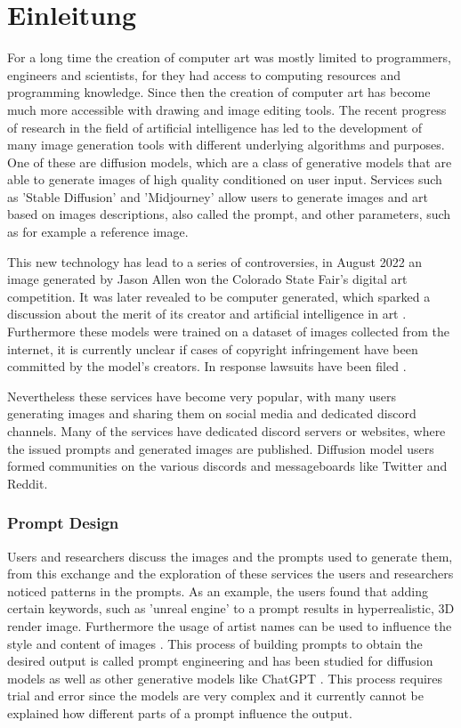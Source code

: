 \chapter{Einleitung}
\label{cha:Introduction}

For a long time the creation of computer art was mostly limited to programmers, engineers and scientists, for they had access to computing resources and programming knowledge. Since then the creation of computer art has become much more accessible with drawing and image editing tools. The recent progress of research in the field of artificial intelligence has led to the development of many image generation tools with different underlying algorithms and purposes. One of these are diffusion models, which are a class of generative models that are able to generate images of high quality conditioned on user input. Services such as 'Stable Diffusion' and 'Midjourney' allow users to generate images and art based on images descriptions, also called the prompt, and other parameters, such as for example a reference image.

This new technology has lead to a series of controversies, in August 2022 an image generated by Jason Allen won the Colorado State Fair's digital art competition. It was later revealed to be computer generated, which sparked a discussion about the merit of its creator and artificial intelligence in art \autocite{colorado}. Furthermore these models were trained on a dataset of images collected from the internet, it is currently unclear if cases of copyright infringement have been committed by the model's creators. In response lawsuits have been filed \autocite{getty}.

Nevertheless these services have become very popular, with many users generating images and sharing them on social media and dedicated discord channels. Many of the services have dedicated discord servers or websites, where the issued prompts and generated images are published. Diffusion model users formed communities on the various discords and messageboards like Twitter and Reddit. 


\subsection{Prompt Design}

Users and researchers discuss the images and the prompts used to generate them, from this exchange and the exploration of these services the users and researchers \autocite{design-guidelines} noticed patterns in the prompts. As an example, the users found that adding certain keywords, such as 'unreal engine' to a prompt results in hyperrealistic, 3D render image. Furthermore the usage of artist names can be used to influence the style and content of images \autocite{investigating}.
This process of building prompts to obtain the desired output is called prompt engineering and has been studied for diffusion models \autocite{investigating} as well as other generative models like ChatGPT \autocite{chatgpt-prompt-patterns}. This process requires trial and error since the models are very complex and it currently cannot be explained how different parts of a prompt influence the output.

